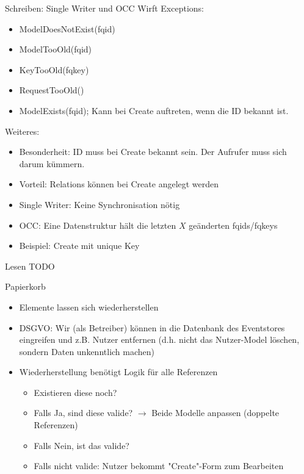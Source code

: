\documentclass[10pt]{beamer}
\begin{document}
\begin{frame}{Schreiben: Single Writer und OCC}
	Wirft Exceptions:
	\begin{itemize}
		\item ModelDoesNotExist(fqid)
		\item ModelTooOld(fqid)
		\item KeyTooOld(fqkey)
		\item RequestTooOld()
		\item ModelExists(fqid); Kann bei Create auftreten, wenn die ID bekannt ist.
	\end{itemize}
	\pause
	Weiteres:
	\begin{itemize}
		\item Besonderheit: ID muss bei Create bekannt sein. Der Aufrufer muss sich darum kümmern.
		\item Vorteil: Relations können bei Create angelegt werden
		\item<3-> Single Writer: Keine Synchronisation nötig
		\item<4-> OCC: Eine Datenstruktur hält die letzten $X$ geänderten fqids/fqkeys
		\item<5-> Beispiel: Create mit unique Key
	\end{itemize}
\end{frame}

\begin{frame}{Lesen}
	TODO
\end{frame}

\begin{frame}{Papierkorb}
	\begin{itemize}
		\item Elemente lassen sich wiederherstellen
		\item DSGVO: Wir (als Betreiber) können in die Datenbank des Eventstores eingreifen und z.B. Nutzer entfernen (d.h. nicht das Nutzer-Model löschen, sondern Daten unkenntlich machen)
		\item Wiederherstellung benötigt Logik für alle Referenzen
		\begin{itemize}
			\item Existieren diese noch?
			\item Falls Ja, sind diese valide? $\rightarrow$ Beide Modelle anpassen (doppelte Referenzen)
			\item Falls Nein, ist das valide?
			\item Falls nicht valide: Nutzer bekommt "Create"-Form zum Bearbeiten
		\end{itemize}
	\end{itemize}
\end{frame}
\end{document}
